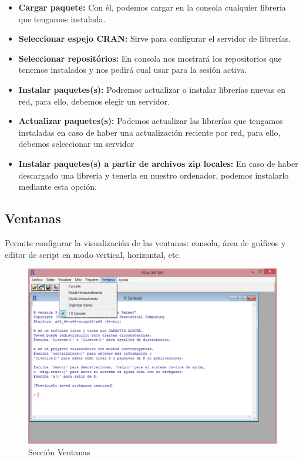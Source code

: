 \documentclass[11pt,a4paper,oneside]{book}\usepackage[]{graphicx}\usepackage[]{color}
\begin{document}
\begin{itemize}
\begin{itemize}
      \item {\bf Cargar paquete:} Con él, podemos cargar en la consola cualquier librería que tengamos instalada.
      \item {\bf Seleccionar espejo CRAN:} Sirve para configurar el servidor de librerías.
      \item {\bf Seleccionar repositórios:} En consola nos mostrará los repositorios que tenemos instalados y nos pedirá cual usar para la sesión activa.
      \item {\bf Instalar paquetes(s):} Podremos actualizar o instalar librerías nuevas en red, para ello, debemos elegir un servidor.
      \item {\bf Actualizar paquetes(s):} Podemos actualizar las librerías que tengamos instaladas en caso de haber una actualización reciente por red, para ello, debemos seleccionar un servidor
      \item {\bf Instalar paquetes(s) a partir de archivos zip locales:} En caso de haber descargado una librería y tenerla en nuestro ordenador, podemos instalarlo mediante esta opción.
\end{itemize}

\subsection{Ventanas} 

Permite configurar la visualización de las ventanas: consola, área de gráficos y editor de script en modo vertical, horizontal, etc.

  \begin{figure}[H]
  \centering
  \includegraphics[scale=.4]{figuras/ventanas.eps}
  \caption{Sección Ventanas}
  \label{ventanas}
  \end{figure}


\end{itemize}
\end{document}
